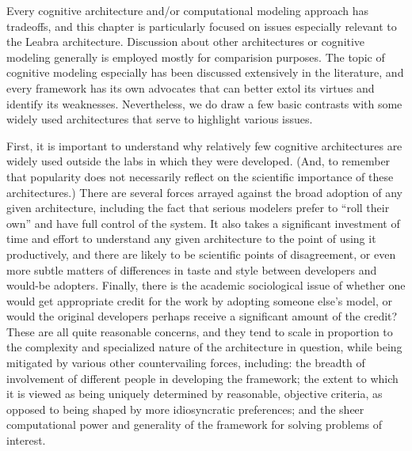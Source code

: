 \documentclass[11pt,twoside]{article}
\begin{document}
Every cognitive architecture and/or computational modeling approach
has tradeoffs, and this chapter is particularly focused on issues
especially relevant to the Leabra architecture. Discussion about other
architectures or cognitive modeling generally is employed mostly for
comparision purposes. The topic of cognitive modeling especially has
been discussed extensively in the literature, and every framework has
its own advocates that can better extol its virtues and identify its
weaknesses.  Nevertheless, we do draw a few basic contrasts with some
widely used architectures that serve to highlight various issues.

First, it is important to understand why relatively few cognitive
architectures are widely used outside the labs in which they were
developed.  (And, to remember that popularity does not necessarily
reflect on the scientific importance of these architectures.)  There
are several forces arrayed against the broad adoption of any given
architecture, including the fact that serious modelers prefer to
``roll their own'' and have full control of the system. It also takes
a significant investment of time and effort to understand any given
architecture to the point of using it productively, and there are
likely to be scientific points of disagreement, or even more subtle
matters of differences in taste and style between developers and
would-be adopters. Finally, there is the academic sociological issue
of whether one would get appropriate credit for the work by adopting
someone else's model, or would the original developers perhaps receive
a significant amount of the credit?  These are all quite reasonable
concerns, and they tend to scale in proportion to the complexity and
specialized nature of the architecture in question, while being
mitigated by various other countervailing forces, including: the
breadth of involvement of different people in developing the
framework; the extent to which it is viewed as being uniquely
determined by reasonable, objective criteria, as opposed to being
shaped by more idiosyncratic preferences; and the sheer computational
power and generality of the framework for solving problems of
interest.
\end{document}
